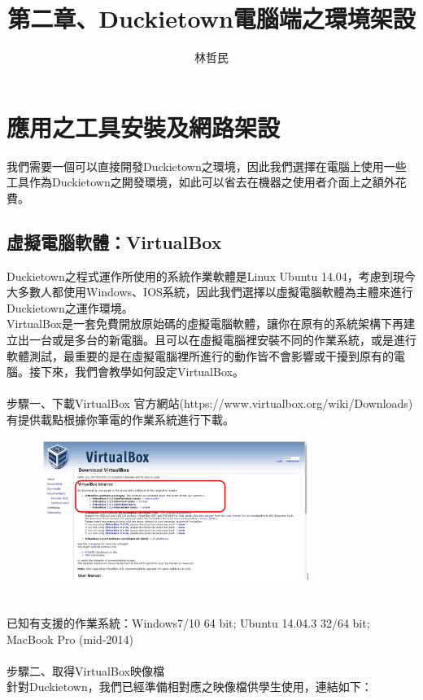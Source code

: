 \documentclass{article}
\title{第二章、Duckietown電腦端之環境架設}
\author{林哲民}
\date{} %
\begin{document}
\maketitle

\section{應用之工具安裝及網路架設}

我們需要一個可以直接開發Duckietown之環境，因此我們選擇在電腦上使用一些工具作為Duckietown之開發環境，如此可以省去在機器之使用者介面上之額外花費。
\subsection{虛擬電腦軟體：VirtualBox}

Duckietown之程式運作所使用的系統作業軟體是Linux Ubuntu 14.04，考慮到現今大多數人都使用Windows、IOS系統，因此我們選擇以虛擬電腦軟體為主體來進行Duckietown之運作環境。
\\VirtualBox是一套免費開放原始碼的虛擬電腦軟體，讓你在原有的系統架構下再建立出一台或是多台的新電腦。且可以在虛擬電腦裡安裝不同的作業系統，或是進行軟體測試，最重要的是在虛擬電腦裡所進行的動作皆不會影響或干擾到原有的電腦。接下來，我們會教學如何設定VirtualBox。
\\
\\步驟一、下載VirtualBox
官方網站(https://www.virtualbox.org/wiki/Downloads)有提供載點根據你筆電的作業系統進行下載。
\\
\begin{figure}[htp]
    \begin{center}
        \includegraphics[width=250pt]{pic/圖片1.jpg}
    \end{center}
\end{figure}
\\
已知有支援的作業系統：Windows7/10 64 bit; Ubuntu 14.04.3 32/64 bit; MacBook Pro (mid-2014)
\\\\步驟二、取得VirtualBox映像檔
\\針對Duckietown，我們已經準備相對應之映像檔供學生使用，連結如下：
\end{document}
